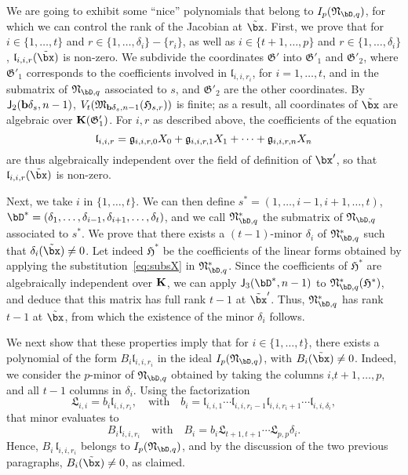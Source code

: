 \documentclass[12pt]{article}
\begin{document}
We are going to exhibit some ``nice'' polynomials that belong to
$I_p(\mathfrak{N}_{\bD,q})$, for which we can control the rank of the
Jacobian at $\tilde\bx$. First, we prove that for $i\in\{1,\dots,t\}$
and $r \in \{1,\dots,\delta_i\}-\{r_i\}$, as well as $i\in\{t+1,\dots,p\}$
and $r \in \{1,\dots,\delta_i\}$, $\mathfrak{l}_{i,i,r}(\tilde\bx)$ is
non-zero.  We subdivide the coordinates $\mathfrak{G}'$ into
$\mathfrak{G}'_1$ and $\mathfrak{G}'_2$, where $\mathfrak{G}'_1$
corresponds to the coefficients involved in $\mathfrak{l}_{i,i,r_i}$,
for $i=1,\dots,t$, and in the submatrix of $\mathfrak{N}_{\bD,q}$
associated to $s$, and $\mathfrak{G}'_2$ are the other coordinates.
By $\mathsf{J}_2(\mathbf{b}\delta_s,n-1)$,  $V_t(\mathfrak{M}_{\mathbf{b}\delta_s,n-1}(\mathfrak{H}_{s,r}))$ 
is finite; as a result, all coordinates of $\tilde\bx$ are algebraic
over $\mathbf{K}(\mathfrak{G}'_1)$. For $i,r$ as described above, the coefficients of the equation
$$\mathfrak{l}_{i,i,r} = \frak{g}_{i,i,r,0} X_0+ \frak{g}_{i,i,r,1}
X_1 +\cdots + \frak{g}_{i,i,r,n} X_n$$ are thus algebraically independent
over the field of definition of $\bx'$, so that $\mathfrak{l}_{i,i,r}(\tilde\bx)$
is non-zero.

Next, we take $i$ in $\{1,\dots,t\}$. We can then define
$s^*=(1,\dots,i-1,i+1,\dots,t)$,
$\bD^*=(\delta_1,\dots,\delta_{i-1},\delta_{i+1},\dots,\delta_t)$, and we call
$\mathfrak{N}_{\bD,q}^*$ the submatrix of
$\mathfrak{N}_{\bD,q}$ associated to $s^*$. We prove that there exists a $(t-1)$-minor
$\delta_i$ of $\mathfrak{N}_{\bD,q}^*$ such that $\delta_i(\tilde\bx)\ne 0$.  Let indeed
$\mathfrak{H}^*$ be the coefficients of the linear forms obtained by
applying the substitution~\eqref{eq:subsX} in
$\mathfrak{N}_{\bD,q}^*$. Since the coefficients of $\mathfrak{H}^*$
are algebraically independent over $\mathbf{K}$, we can apply $\assI_3(\bD^*,n-1)$ to $\mathfrak{N}_{\bD,q}^*(\mathfrak{H}^*)$,
and deduce that this matrix has full rank $t-1$ at $\tilde\bx'$.
Thus, $\mathfrak{N}_{\bD,q}^*$ has rank $t-1$ at $\tilde\bx$, 
from which the existence of the minor $\delta_i$ follows.

We next show that these properties imply that for $i\in\{1,\dots,t\}$,
there exists a polynomial of the form $B_{i} \mathfrak{l}_{i,i,r_i}$
in the ideal $I_p(\mathfrak{N}_{\bD,q})$, with $B_{i}(\tilde\bx)\ne
0$. Indeed, we consider the $p$-minor of $\mathfrak{N}_{\bD,q}$
obtained by taking the columns $i$,$t+1,\dots,p$, and all $t-1$ columns
in $\delta_i$. Using the factorization
$$\mathfrak{L}_{i,i} = b_i \mathfrak{l}_{i,i,r_i},\quad\text{with}\quad
b_i=\mathfrak{l}_{i,i,1}\cdots \mathfrak{l}_{i,i,r_i-1}\mathfrak{l}_{i,i,r_i+1}\cdots \mathfrak{l}_{i,i,\delta_i},$$
that minor evaluates to 
$$B_i \mathfrak{l}_{i,i,r_i}\quad\text{with}\quad B_i = b_i
\mathfrak{L}_{t+1,t+1}\cdots \mathfrak{L}_{p,p}\delta_i.$$ Hence, $B_i\,
\mathfrak{l}_{i,i,r_i}$ belongs to $I_p(\mathfrak{N}_{\bD,q})$, and by
the discussion of the two previous paragraphs, $B_i(\tilde\bx)\ne 0$,
as claimed.
\end{document}
